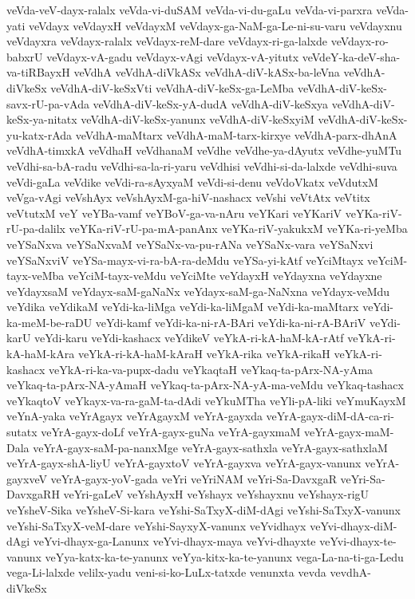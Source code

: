 {veVda-veV-dayx-ralalx
veVda-vi-duSAM
veVda-vi-du-gaLu
veVda-vi-parxra
veVda-yati
veVdayx
veVdayxH
veVdayxM
veVdayx-ga-NaM-ga-Le-ni-su-varu
veVdayxnu
veVdayxra
veVdayx-ralalx
veVdayx-reM-dare
veVdayx-ri-ga-lalxde
veVdayx-ro-babxrU
veVdayx-vA-gadu
veVdayx-vAgi
veVdayx-vA-yitutx
veVdeY-ka-deV-sha-va-tiRBayxH
veVdhA
veVdhA-diVkASx
veVdhA-diV-kASx-ba-leVna
veVdhA-diVkeSx
veVdhA-diV-keSxVti
veVdhA-diV-keSx-ga-LeMba
veVdhA-diV-keSx-savx-rU-pa-vAda
veVdhA-diV-keSx-yA-dudA
veVdhA-diV-keSxya
veVdhA-diV-keSx-ya-nitatx
veVdhA-diV-keSx-yanunx
veVdhA-diV-keSxyiM
veVdhA-diV-keSx-yu-katx-rAda
veVdhA-maMtarx
veVdhA-maM-tarx-kirxye
veVdhA-parx-dhAnA
veVdhA-timxkA
veVdhaH
veVdhanaM
veVdhe
veVdhe-ya-dAyutx
veVdhe-yuMTu
veVdhi-sa-bA-radu
veVdhi-sa-la-ri-yaru
veVdhisi
veVdhi-si-da-lalxde
veVdhi-suva
veVdi-gaLa
veVdike
veVdi-ra-sAyxyaM
veVdi-si-denu
veVdoVkatx
veVdutxM
veVga-vAgi
veVshAyx
veVshAyxM-ga-hiV-nashacx
veVshi
veVtAtx
veVtitx
veVtutxM
veY
veYBa-vamf
veYBoV-ga-va-nAru
veYKari
veYKariV
veYKa-riV-rU-pa-dalilx
veYKa-riV-rU-pa-mA-panAnx
veYKa-riV-yakukxM
veYKa-ri-yeMba
veYSaNxva
veYSaNxvaM
veYSaNx-va-pu-rANa
veYSaNx-vara
veYSaNxvi
veYSaNxviV
veYSa-mayx-vi-ra-bA-ra-deMdu
veYSa-yi-kAtf
veYciMtayx
veYciM-tayx-veMba
veYciM-tayx-veMdu
veYciMte
veYdayxH
veYdayxna
veYdayxne
veYdayxsaM
veYdayx-saM-gaNaNx
veYdayx-saM-ga-NaNxna
veYdayx-veMdu
veYdika
veYdikaM
veYdi-ka-liMga
veYdi-ka-liMgaM
veYdi-ka-maMtarx
veYdi-ka-meM-be-raDU
veYdi-kamf
veYdi-ka-ni-rA-BAri
veYdi-ka-ni-rA-BAriV
veYdi-karU
veYdi-karu
veYdi-kashacx
veYdikeV
veYkA-ri-kA-haM-kA-rAtf
veYkA-ri-kA-haM-kAra
veYkA-ri-kA-haM-kAraH
veYkA-rika
veYkA-rikaH
veYkA-ri-kashacx
veYkA-ri-ka-va-pupx-dadu
veYkaqtaH
veYkaq-ta-pArx-NA-yAma
veYkaq-ta-pArx-NA-yAmaH
veYkaq-ta-pArx-NA-yA-ma-veMdu
veYkaq-tashacx
veYkaqtoV
veYkayx-va-ra-gaM-ta-dAdi
veYkuMTha
veYli-pA-liki
veYmuKayxM
veYnA-yaka
veYrAgayx
veYrAgayxM
veYrA-gayxda
veYrA-gayx-diM-dA-ca-ri-sutatx
veYrA-gayx-doLf
veYrA-gayx-guNa
veYrA-gayxmaM
veYrA-gayx-maM-Dala
veYrA-gayx-saM-pa-nanxMge
veYrA-gayx-sathxla
veYrA-gayx-sathxlaM
veYrA-gayx-shA-liyU
veYrA-gayxtoV
veYrA-gayxva
veYrA-gayx-vanunx
veYrA-gayxveV
veYrA-gayx-yoV-gada
veYri
veYriNAM
veYri-Sa-DavxgaR
veYri-Sa-DavxgaRH
veYri-gaLeV
veYshAyxH
veYshayx
veYshayxnu
veYshayx-rigU
veYsheV-Sika
veYsheV-Si-kara
veYshi-SaTxyX-diM-dAgi
veYshi-SaTxyX-vanunx
veYshi-SaTxyX-veM-dare
veYshi-SayxyX-vanunx
veYvidhayx
veYvi-dhayx-diM-dAgi
veYvi-dhayx-ga-Lanunx
veYvi-dhayx-maya
veYvi-dhayxte
veYvi-dhayx-te-vanunx
veYya-katx-ka-te-yanunx
veYya-kitx-ka-te-yanunx
vega-La-na-ti-ga-Ledu
vega-Li-lalxde
velilx-yadu
veni-si-ko-LuLx-tatxde
venunxta
vevda
vevdhA-diVkeSx
}

